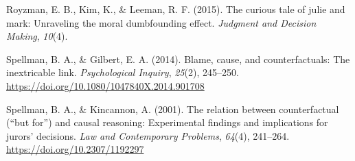 \documentclass[
  man, donotrepeattitle,floatsintext]{apa6}
\newlength{\cslhangindent}
\newlength{\cslentryspacingunit} %
\newenvironment{CSLReferences}[2] %
 {%
  \setlength{\parindent}{0pt}
  \ifodd #1
  \let\oldpar\par
  \def\par{\hangindent=\cslhangindent\oldpar}
  \fi
  \setlength{\parskip}{#2\cslentryspacingunit}
 }%
 {}
\begin{document}
\begin{CSLReferences}{1}{0}
\leavevmode{}%
Royzman, E. B., Kim, K., \& Leeman, R. F. (2015). The curious tale of julie and mark: Unraveling the moral dumbfounding effect. \emph{Judgment and Decision Making}, \emph{10}(4).

\leavevmode{}%
Spellman, B. A., \& Gilbert, E. A. (2014). Blame, cause, and counterfactuals: The inextricable link. \emph{Psychological Inquiry}, \emph{25}(2), 245--250. \url{https://doi.org/10.1080/1047840X.2014.901708}

\leavevmode{}%
Spellman, B. A., \& Kincannon, A. (2001). The relation between counterfactual ({``but for''}) and causal reasoning: Experimental findings and implications for jurors' decisions. \emph{Law and Contemporary Problems}, \emph{64}(4), 241--264. \url{https://doi.org/10.2307/1192297}

\end{CSLReferences}
\end{document}
